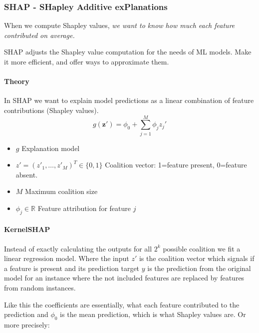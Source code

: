 \subsubsection{SHAP - SHapley Additive exPlanations}
When we compute Shapley values, \textit{we want to know how much each feature contributed on average.}

SHAP adjusts the Shapley value computation for the needs of ML models. Make it more efficient, and offer ways to approximate them.

\paragraph{Theory}

In SHAP we want to explain model predictions as a linear combination of feature contributions (Shapley values).
\begin{equation}
	g(\mathbf{z}')=\phi_0+\sum_{j=1}^M\phi_j z_j'
	\label{eq:shap-explanation-g}
\end{equation}
\begin{itemize}
	\item $g$ Explanation model
	\item $z' = (z'_1, \ldots, z'_M)^T \in \{0,1\}$ Coalition vector: 1=feature present, 0=feature absent.
	\item $M$ Maximum coalition size
	\item $\phi_j \in \mathbb{R}$ Feature attribution for feature $j$
\end{itemize}

\paragraph{KernelSHAP}
Instead of exactly calculating the outputs for all $2^k$ possible coalition we fit a linear regression model.
Where the input $z'$ is the coalition vector which signals if a feature is present and its prediction target $y$ is the prediction from the original model
for an instance where the not included features are replaced by features from random instances.

Like this the coefficients are essentially, what each feature contributed to the prediction and $\phi_0$ is the mean prediction, which is what Shapley values are.
Or more precisely:

